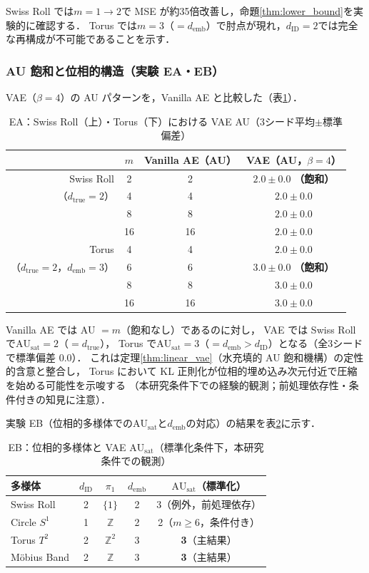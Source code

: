 \documentclass[11pt,a4paper]{jsarticle}
\newcommand{\dID}{d_{\mathrm{ID}}}
\newcommand{\dtrue}{d_{\mathrm{true}}}
\newcommand{\AUsat}{\mathrm{AU}_{\mathrm{sat}}}
\newcommand{\demb}{d_{\mathrm{emb}}}
\begin{document}
Swiss Roll では$m = 1 \to 2$で MSE が約35倍改善し，命題\ref{thm:lower_bound}を実験的に確認する．
Torus では$m = 3$（$= \demb$）で肘点が現れ，$\dID = 2$では完全な再構成が不可能であることを示す．

\subsubsection{AU 飽和と位相的構造（実験 EA・EB）}

VAE（$\beta = 4$）の AU パターンを，Vanilla AE と比較した（表\ref{tab:ea_summary}）．

\begin{table}[H]
\centering
\caption{EA：Swiss Roll（上）・Torus（下）における VAE AU（3シード平均$\pm$標準偏差）}
\label{tab:ea_summary}
\small
\begin{tabular}{rccc}
\toprule
 & $m$ & Vanilla AE（AU） & VAE（AU，$\beta=4$） \\
\midrule
Swiss Roll & 2 & 2 & $2.0\pm0.0$ \textbf{（飽和）} \\
（$\dtrue = 2$） & 4 & 4 & $2.0\pm0.0$ \\
 & 8 & 8 & $2.0\pm0.0$ \\
 & 16 & 16 & $2.0\pm0.0$ \\
\midrule
Torus & 4 & 4 & $2.0\pm0.0$ \\
（$\dtrue = 2$，$\demb = 3$） & 6 & 6 & $3.0\pm0.0$ \textbf{（飽和）} \\
 & 8 & 8 & $3.0\pm0.0$ \\
 & 16 & 16 & $3.0\pm0.0$ \\
\bottomrule
\end{tabular}
\end{table}

Vanilla AE では AU $= m$（飽和なし）であるのに対し，
VAE では Swiss Roll で$\AUsat = 2$（$= \dtrue$），
Torus で$\AUsat = 3$（$= \demb > \dID$）となる（全3シードで標準偏差 0.0）．
これは定理\ref{thm:linear_vae}（水充填的 AU 飽和機構）の定性的含意と整合し，
Torus において KL 正則化が位相的埋め込み次元付近で圧縮を始める可能性を示唆する
（本研究条件下での経験的観測；前処理依存性・条件付きの知見に注意）．

実験 EB（位相的多様体での$\AUsat$と$\demb$の対応）の結果を表\ref{tab:eb_summary}に示す．

\begin{table}[H]
\centering
\caption{EB：位相的多様体と VAE $\AUsat$（標準化条件下，本研究条件での観測）}
\label{tab:eb_summary}
\small
\begin{tabular}{lcccc}
\toprule
多様体 & $\dID$ & $\pi_1$ & $\demb$ & $\AUsat$（標準化） \\
\midrule
Swiss Roll   & 2 & $\{1\}$        & 2 & 3（例外，前処理依存）\\
Circle $S^1$ & 1 & $\mathbb{Z}$   & 2 & 2（$m \geq 6$，条件付き）\\
Torus $T^2$  & 2 & $\mathbb{Z}^2$ & 3 & \textbf{3}（主結果）\\
Möbius Band  & 2 & $\mathbb{Z}$   & 3 & \textbf{3}（主結果）\\
\bottomrule
\end{tabular}
\end{table}
\end{document}
